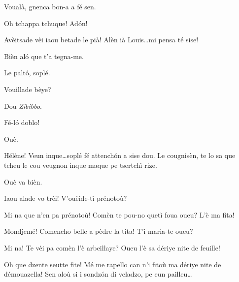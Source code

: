 \begin{drama}
\Bertaspeaks Voualà, gnenca bon-a a fé sen.



\Pierrespeaks Oh tchappa tchuque! Ad\'on!


\Pierrespeaks Avèitsade vèi iaou betade le pià! Alèn ià Louis\ldots mi pensa té sise!


\Louisspeaks Bièn al\'o que t'a tegna-me.

\Pierrespeaks{} Le palt\'o, soplé.


\Helenespeaks{} Vouillade bèye?

\Augustespeaks Dou \textit{Zibibbo}.

\Paulspeaks{} Fé-l\'o doblo!

\Helenespeaks Ouè.

\Bertaspeaks{} Hélène! Veun inque\ldots soplé fé attench\'on a sise dou. Le cougnisèn, te lo sa que tcheu le cou veugnon inque maque pe tsertchì rize.

\Helenespeaks Ouè va bièn.
 

\Dorinaspeaks Iaou alade vo trèi! V'ouèide-tì prénotoù?

\Vilmaspeaks Mi na que n'en pa prénotoù! Comèn te pou-no quetì foua oueu? L’è ma fita!

\Dorinaspeaks Mondjemé! Comencho belle a pèdre la tita! T'i maria-te oueu?

\Vandaspeaks Mi na! Te vèi pa comèn l'è arbeillaye? Oueu l'è sa dériye nite de feuille!

\Dorinaspeaks Oh que dzente seutte fite!
Mé me rapello can n'i fitoù ma dériye nite de démouazella! Sen aloù si i sondz\'on di veladzo, pe eun pailleu\ldots


\end{drama}

